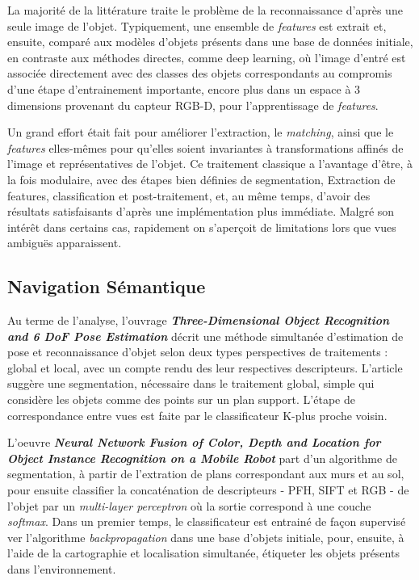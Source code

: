 La majorité de la littérature traite le problème de la reconnaissance d'après une seule image de l'objet. Typiquement, une ensemble de \textit{features} est extrait et, ensuite, comparé aux modèles d'objets présents dans une base de données initiale, en contraste aux méthodes directes, comme deep learning, où l'image d'entré est associée directement avec des classes des objets correspondants au compromis d'une étape d'entrainement importante, encore plus dans un espace à 3 dimensions provenant du capteur RGB-D, pour l'apprentissage de \textit {features}. 

Un grand effort était fait pour améliorer l'extraction, le \textit {matching}, ainsi que le \textit{features} elles-mêmes pour qu'elles soient invariantes à transformations affinés de l'image et représentatives de l'objet. Ce traitement classique a l’avantage d'être, à la fois modulaire, avec des étapes bien définies de segmentation, Extraction de features, classification et post-traitement, et, au même temps, d'avoir des résultats satisfaisants d’après une implémentation plus immédiate. Malgré son intérêt dans certains cas, rapidement on s’aperçoit de limitations lors que vues ambiguës apparaissent.

\subsection{Navigation Sémantique}
Au terme de l'analyse, l'ouvrage \textbf{\textit{Three-Dimensional Object Recognition and 6 DoF Pose Estimation}} décrit une méthode simultanée d'estimation de pose et reconnaissance d'objet selon deux types perspectives de traitements : global et local, avec un compte rendu des leur respectives descripteurs. L'article suggère une segmentation, nécessaire dans le traitement global, simple qui considère les objets comme des points sur un plan support. L'étape de correspondance entre vues est faite par le classificateur K-plus proche voisin.

L'oeuvre \textbf{\textit{Neural Network Fusion of Color, Depth and Location for Object Instance Recognition on a Mobile Robot}} part d'un algorithme de segmentation, à partir de l'extration de plans correspondant aux murs et au sol, pour ensuite classifier la concaténation de descripteurs - PFH, SIFT et RGB - de l'objet par un \textit{multi-layer perceptron} où la sortie correspond à une couche \textit{softmax}. Dans un premier temps, le classificateur est entrainé de façon supervisé ver l'algorithme \textit{backpropagation} dans une base d'objets initiale, pour, ensuite, à l'aide de la cartographie et localisation simultanée, étiqueter les objets présents dans l'environnement. 

